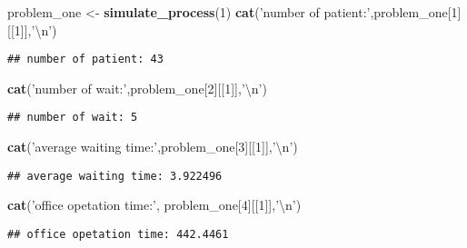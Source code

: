 \documentclass[]{article}
\newenvironment{Shaded}{\begin{snugshade}}{\end{snugshade}}
\newcommand{\KeywordTok}[1]{\textcolor[rgb]{0.13,0.29,0.53}{\textbf{#1}}}
\newcommand{\DecValTok}[1]{\textcolor[rgb]{0.00,0.00,0.81}{#1}}
\newcommand{\CharTok}[1]{\textcolor[rgb]{0.31,0.60,0.02}{#1}}
\newcommand{\StringTok}[1]{\textcolor[rgb]{0.31,0.60,0.02}{#1}}
\newcommand{\NormalTok}[1]{#1}
\begin{document}
\begin{Shaded}
\begin{Highlighting}[]
\NormalTok{problem_one <-}\StringTok{ }\KeywordTok{simulate_process}\NormalTok{(}\DecValTok{1}\NormalTok{)}
\KeywordTok{cat}\NormalTok{(}\StringTok{'number of patient:'}\NormalTok{,problem_one[}\DecValTok{1}\NormalTok{][[}\DecValTok{1}\NormalTok{]],}\StringTok{'}\CharTok{\textbackslash{}n}\StringTok{'}\NormalTok{)}
\end{Highlighting}
\end{Shaded}

\begin{verbatim}
## number of patient: 43
\end{verbatim}

\begin{Shaded}
\begin{Highlighting}[]
\KeywordTok{cat}\NormalTok{(}\StringTok{'number of wait:'}\NormalTok{,problem_one[}\DecValTok{2}\NormalTok{][[}\DecValTok{1}\NormalTok{]],}\StringTok{'}\CharTok{\textbackslash{}n}\StringTok{'}\NormalTok{)}
\end{Highlighting}
\end{Shaded}

\begin{verbatim}
## number of wait: 5
\end{verbatim}

\begin{Shaded}
\begin{Highlighting}[]
\KeywordTok{cat}\NormalTok{(}\StringTok{'average waiting time:'}\NormalTok{,problem_one[}\DecValTok{3}\NormalTok{][[}\DecValTok{1}\NormalTok{]],}\StringTok{'}\CharTok{\textbackslash{}n}\StringTok{'}\NormalTok{)}
\end{Highlighting}
\end{Shaded}

\begin{verbatim}
## average waiting time: 3.922496
\end{verbatim}

\begin{Shaded}
\begin{Highlighting}[]
\KeywordTok{cat}\NormalTok{(}\StringTok{'office opetation time:'}\NormalTok{, problem_one[}\DecValTok{4}\NormalTok{][[}\DecValTok{1}\NormalTok{]],}\StringTok{'}\CharTok{\textbackslash{}n}\StringTok{'}\NormalTok{)}
\end{Highlighting}
\end{Shaded}

\begin{verbatim}
## office opetation time: 442.4461
\end{verbatim}
\end{document}
